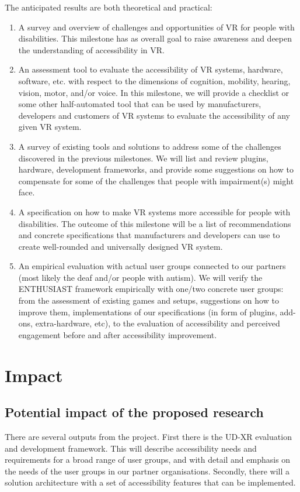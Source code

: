 The anticipated results are both theoretical and practical:
\begin{enumerate}
\item 
A survey and overview of challenges and opportunities of VR for people with disabilities. 
This milestone has as overall goal to raise awareness and deepen the understanding of accessibility in VR.

\item An assessment tool to evaluate the accessibility of VR systems, hardware, software, etc. with respect to the
dimensions of cognition, mobility, hearing, vision, motor, and/or voice. In this milestone, we will provide a
checklist or some other half-automated tool that can be used by manufacturers, developers and customers of VR systems
to evaluate the accessibility of any given VR system.

\item A survey of existing tools and solutions to address some of the challenges discovered in the previous milestones. We
will list and review plugins, hardware, development frameworks, and provide some suggestions on how to compensate for
some of the challenges that people with impairment(s) might face.

\item A specification on how to make VR systems more accessible for people with disabilities.
The outcome of this milestone will be a list of recommendations and concrete specifications that manufacturers and
developers can use to create well-rounded and universally designed VR system.

\item An empirical evaluation with actual user groups connected to our partners (most likely the deaf and/or people with
autism).
We will verify the ENTHUSIAST framework empirically with one/two concrete user groups: from the assessment of existing
games and setups, suggestions on how to improve them, implementations of our specifications (in form of plugins,
add-ons, extra-hardware, etc), to the evaluation of accessibility and perceived engagement before and after
accessibility improvement.
\end{enumerate}

\section[Impact ]{Impact }
\subsection[Potential impact of the proposed research ]{Potential impact of the proposed research }
There are several outputs from the project. First there is the UD-XR evaluation and development framework. This will
describe accessibility needs and requirements for a broad range of user groups, and with detail and emphasis on the
needs of the user groups in our partner organisations. Secondly, there will a solution architecture with a set of
accessibility features that can be implemented. 

